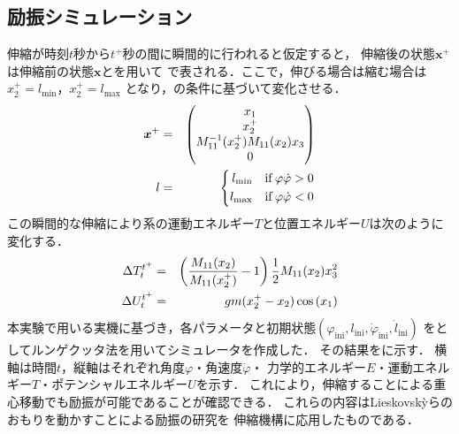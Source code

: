          \subsection{励振シミュレーション}
          伸縮が時刻$t$秒から$t^{+}$秒の間に瞬間的に行われると仮定すると，
          伸縮後の状態$\bm{x}^{+}$は伸縮前の状態$\bm{x}$とを用いて
          で表される．ここで，伸びる場合は縮む場合は$x_2^{+}=l_{\mathrm{min}}$，$x_2^{+}=l_{\mathrm{max}}$
          となり，の条件に基づいて変化させる．
          \begin{eqnarray}
            \equlabel{xx}
            \bm{x}^{+}&=&
            \begin{pmatrix}
                x_1\\
                x_2^{+}\\
                M_{11}^{-1}(x_2^{+})M_{11}(x_2)x_3\\
                0\\
                \end{pmatrix}\\
            \equlabel{l_change}
           l&=& \left\{
              \begin{aligned}
                l_{\mathrm{min}}\quad \mathrm{if}\,\varphi\dot{\varphi}>0\\
                l_{\mathrm{max}}\quad \mathrm{if}\,\varphi\dot{\varphi}<0
              \end{aligned}
            \right.
            \end{eqnarray}
          この瞬間的な伸縮により系の運動エネルギー$T$と位置エネルギー$U$は次のように変化する．
          \begin{eqnarray}
            \equlabel{dT}
            \Delta T_t^{t^{+}}&=&\left(\frac{M_{11}(x_2)}{M_{11}(x_2^{+})}-1\right)\frac{1}{2}M_{11}(x_2)x_3^2\\
            \equlabel{dU}
            \Delta U_t^{t^{+}}&=&gm(x_2^{+}-x_2)\cos{(x_1)}            
            \end{eqnarray}
          本実験で用いる実機に基づき，各パラメータと初期状態$(\varphi_{\mathrm{ini}},l_{\mathrm{ini}},\dot{\varphi}_{\mathrm{ini}},\dot{l}_{\mathrm{ini}})$
          をとしてルンゲクッタ法を用いてシミュレータを作成した．
          その結果をに示す．
          横軸は時間$t$，縦軸はそれぞれ角度$\varphi$・角速度$\dot{\varphi}$・
          力学的エネルギー$E$・運動エネルギー$T$・ポテンシャルエネルギー$U$を示す．
          これにより，伸縮することによる重心移動でも励振が可能であることが確認できる．
          これらの内容はLieskovsk{\`y}らのおもりを動かすことによる励振の研究\cite{lieskovsky2023optimal}を
          伸縮機構に応用したものである．


